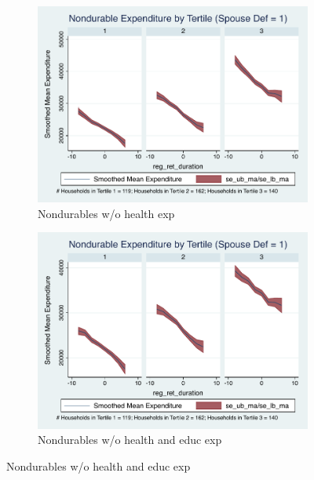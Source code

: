 \documentclass[11pt,onecolumn]{article}
\numberwithin{figure}{section}
\begin{document}
\begin{figure}
  \begin{subfigure}{0.5\textwidth}
  \centering
 	\includegraphics[width=0.9\linewidth]{../ConsumptionPostRetirement_by_SpouseDef/Smoothed_xhealth/post_2005/spouse_def_1.pdf}
    \caption{Nondurables w/o health exp}
    \label{fig:chapter001_dist_001}
  \end{subfigure}
  	\hspace{1cm}
  \begin{subfigure}{0.5\textwidth}
 	\includegraphics[width=0.9\linewidth]{../ConsumptionPostRetirement_by_SpouseDef/Smoothed_xhealth_educ/post_2005/spouse_def_1.pdf}
    \caption{Nondurables w/o health and educ exp}
    \label{fig:chapter001_reward_001}
  \end{subfigure}
  
\end{figure}
\clearpage
\end{document}
